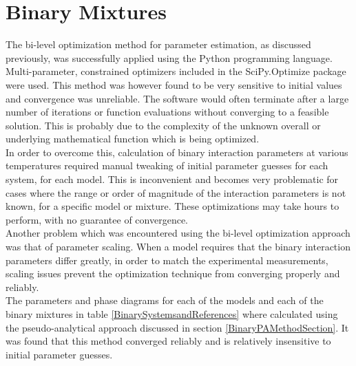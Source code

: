 
\section{Binary Mixtures}

The bi-level optimization method for parameter estimation, as discussed previously, was successfully applied using the Python programming language. Multi-parameter, constrained optimizers included in the SciPy.Optimize package were used. This method was however found to be very sensitive to initial values and convergence was unreliable. The software would often terminate after a large number of iterations or function evaluations without converging to a feasible solution. This is probably due to the complexity of the unknown overall or underlying mathematical function which is being optimized.\\

In order to overcome this, calculation of binary interaction parameters at various temperatures required manual tweaking of initial parameter guesses for each system, for each model. This is inconvenient and becomes very problematic for cases where the range or order of magnitude of the interaction parameters is not known, for a specific model or mixture. These optimizations may take hours to perform, with no guarantee of convergence.\\

Another problem which was encountered using the bi-level optimization approach was that of parameter scaling. When a model requires that the binary interaction parameters differ greatly, in order to match the experimental measurements, scaling issues prevent the optimization technique from converging properly and reliably.\\

The parameters and phase diagrams for each of the models and each of the binary mixtures in table \ref{BinarySystemsandReferences} where calculated using the pseudo-analytical approach discussed in section \ref{BinaryPAMethodSection}. It was found that this method converged reliably and is relatively insensitive to initial parameter guesses.\\

